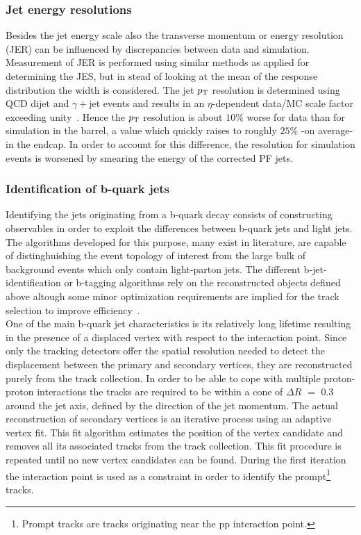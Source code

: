 \subsubsection*{Jet energy resolutions}
Besides the jet energy scale also the transverse momentum or energy resolution (JER) can be influenced by discrepancies between data and simulation. %
Measurement of JER is performed using similar methods as applied for determining the JES, but in stead of looking at the mean of the response distribution the width is considered.
The jet $p_{\rm T}$ resolution is determined using QCD dijet and $\gamma+$jet events and results in an $\eta$-dependent data/MC scale factor exceeding unity~\cite{}. Hence the $p_{\rm T}$ resolution is about $10 \%$ worse for data than for simulation in the barrel, a value which quickly raises to roughly $25\%$ -on average- in the endcap. In order to account for this difference, the resolution for simulation events is worsened by smearing the energy of the corrected PF jets.

\subsubsection*{Identification of b-quark jets}

Identifying the jets originating from a b-quark decay consists of constructing observables in order to exploit the differences between b-quark jets and light jets. The algorithms developed for this purpose, many exist in literature, are capable of distinghuishing the event topology of interest from the large bulk of background events which only contain light-parton jets.
The different b-jet-identification or b-tagging algorithms rely on the reconstructed objects defined above altough some minor optimization requirements are implied for the track selection to improve efficiency~\cite{}.
\\
One of the main b-quark jet characteristics is its relatively long lifetime resulting in the presence of a displaced vertex with respect to the interaction point. Since only the tracking detectors offer the spatial resolution needed to detect the displacement between the primary and secondary vertices, they are reconstructed purely from the track collection. In order to be able to cope with multiple proton-proton interactions the tracks are required to be within a cone of $\Delta R$ $=$ $0.3$ around the jet axis, defined by the direction of the jet momentum. 
The actual reconstruction of secondary vertices is an iterative process using an adaptive vertex fit. This fit algorithm estimates the position of the vertex candidate and removes all its associated tracks from the track collection. This fit procedure is repeated until no new vertex candidates can be found. During the first iteration the interaction point is used as a constraint in order to identify the prompt\footnote{Prompt tracks are tracks originating near the pp interaction point.} tracks.

